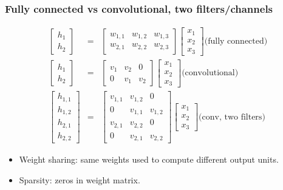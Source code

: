 \documentclass{beamer}
\begin{document}
\begin{frame}[fragile]
  \frametitle{Fully connected vs convolutional, two filters/channels}
  \begin{eqnarray*}
  \begin{bmatrix}
    h_1 \\
    h_2 
  \end{bmatrix}
    &=&
  \begin{bmatrix}
    w_{1,1} & w_{1,2} & w_{1,3} \\
    w_{2,1} & w_{2,2} & w_{2,3}
  \end{bmatrix}
  \begin{bmatrix}
    x_1 \\
    x_2 \\
    x_3
  \end{bmatrix} \text{(fully connected)}
    \\
  \begin{bmatrix}
    h_1 \\
    h_2 
  \end{bmatrix}
    &=&
  \begin{bmatrix}
    v_{1} & v_{2} & 0 \\
    0 & v_{1} & v_{2}
  \end{bmatrix}
  \begin{bmatrix}
    x_1 \\
    x_2 \\
    x_3
  \end{bmatrix} \text{(convolutional)}\\
  \begin{bmatrix}
    h_{1,1} \\
    h_{1,2} \\
    h_{2,1} \\
    h_{2,2}
  \end{bmatrix}
    &=&
  \begin{bmatrix}
    v_{1,1} & v_{1,2} & 0 \\
    0 & v_{1,1} & v_{1,2} \\
    v_{2,1} & v_{2,2} & 0 \\
    0 & v_{2,1} & v_{2,2}
  \end{bmatrix}
  \begin{bmatrix}
    x_1 \\
    x_2 \\
    x_3
  \end{bmatrix} \text{(conv, two filters)}
  \end{eqnarray*}
  \begin{itemize}
  \item Weight sharing: same weights used to compute different
    output units. 
  \item Sparsity: zeros in weight matrix.
  \end{itemize}
\end{frame}
\end{document}
